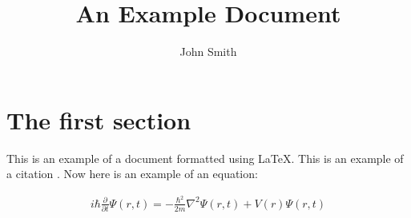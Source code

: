                                                                                                                                                                                                                                                                                                                                                                                                                                                                                                                             \documentclass[12pt]{article}
\title{An Example Document}
\author{John Smith}
\date{}
\begin{document}
\maketitle

\section{The first section}

This is an example of a document formatted using \LaTeX{}.
This is an example of a citation \cite{gG07}.
Now here is an example of an equation:

\begin{align}
i\hbar\frac{\partial}{\partial t}\Psi(r,t) = -\frac{\hbar^2}{2m}\nabla^2\Psi(r,t)+V(r)\Psi(r,t)
\end{align}




\end{document}
